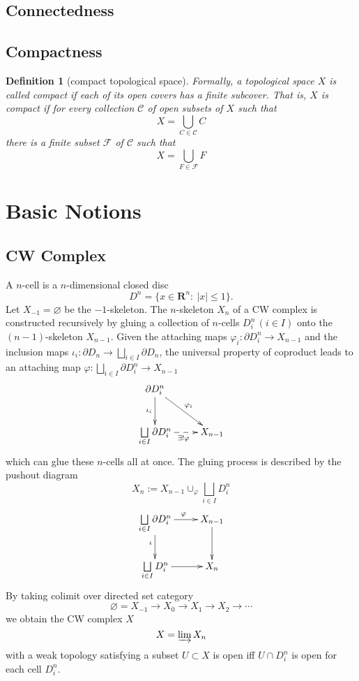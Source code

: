 \documentclass{report}
\newtheorem{definition}{Definition}[section]
\theoremstyle{nonumberplain}
\begin{document}
\section{Connectedness}

\section{Compactness}
\begin{definition}[compact topological space]
	Formally, a topological space $X$ is called \emph{compact} if each of its open covers has a finite subcover. That is, $X$ is compact if for every collection $\mathcal{C}$ of open subsets of $X$ such that
	\[
		X=\bigcup_{C \in \mathcal{C}} C
	\]
	there is a finite subset $\mathcal{F}$ of $\mathcal{C}$ such that
	\[
		X=\bigcup_{F \in \mathcal{F}} F
	\]
\end{definition}

\chapter{Basic Notions}
\section{CW Complex}
A $n$-cell is a $n$-dimensional closed disc
\[
	D^n=\{x\in\mathbf{R}^n:\ |x|\le 1\}.
\]
Let $X_{-1}=\varnothing$ be the $-1$-skeleton. The $n$-skeleton $X_n$ of a CW complex is constructed recursively by gluing a collection of $n$-cells $D^n_i\,(i\in I)$ onto the $(n-1)$-skeleton $X_{n-1}$. Given the attaching maps $\varphi_i:\partial D^n_i\to X_{n-1}$ and the inclusion maps $\iota_i:\partial D_n\to \bigsqcup\limits_{i\in I}\partial D_n$, the universal property of coproduct leads to an attaching map $\varphi:\bigsqcup\limits_{i\in I}\partial D^n_i\to X_{n-1}$  
\[\xymatrix{
	\partial D^n_i\ar[rd]^{\varphi_i}\ar[d]_{\iota_i}&\\
	\bigsqcup\limits_{i\in I}\partial D^n_i\ar@{-->}[r]_{\exists!\varphi} &X_{n-1}
		}\]
which can glue these $n$-cells all at once. The gluing process is described by the pushout diagram
\[
	X_{n}:=X_{n-1}\cup_{\varphi}\bigsqcup\limits_{i\in I} D^n_i
\]
\[\xymatrix{
	\bigsqcup\limits_{i\in I}\partial D^n_i\ar[r]^{\varphi}\ar[d]_{\iota}  &X_{n-1}\ar[d]_{}\\
	\bigsqcup\limits_{i\in I} D^n_i\ar@{->}[r]_{}&X_{n}
		}\]
By taking colimit over directed set category
$$
\varnothing=X_{-1} \rightarrow X_0 \rightarrow X_1 \rightarrow X_2 \rightarrow \cdots
$$
we obtain the CW complex $X$
\[
	X=\varinjlim X_n
\]
with a weak topology satisfying a subset $U \subset X$ is open iff $U \cap D^n_i$ is open for each cell $D^n_i$.
\end{document}
